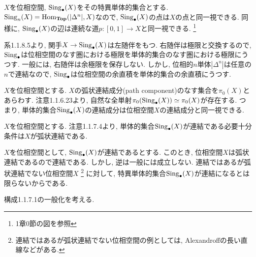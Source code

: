 \documentclass[uplatex, a4paper, 14Q, dvipdfmx]{jsreport}
\begin{document}
\begin{example}
  $X$を位相空間, $\mathrm{Sing}_\bullet(X)$をその特異単体的集合とする. 
  $\mathrm{Sing}_n(X)=\mathrm{Hom}_{\mathbf{Top}}(|\Delta^n|,X)$なので, $\mathrm{Sing}_\bullet(X)$の点は$X$の点と同一視できる. 
  同様に, $\mathrm{Sing}_\bullet(X)$の辺は連続な道$p: [0,1] \to X$と同一視できる. 
  \footnote{
    1章0節の図を参照
  }
\end{example}

\begin{remark}
  系1.1.8.5より, 関手$X \to \mathrm{Sing}_\bullet(X)$は左随伴をもつ. 
  右随伴は極限と交換するので, $\mathrm{Sing}_\bullet$は位相空間のなす圏における極限を単体的集合のなす圏における極限にうつす. 
  一般には, 右随伴は余極限を保存しない. 
  しかし, 位相的$n$単体$|\Delta^n|$は任意の$n$で連結なので, $\mathrm{Sing}_\bullet$は位相空間の余直積を単体的集合の余直積にうつす.
\end{remark}

\begin{remark}
  $X$を位相空間とする. 
  $X$の弧状連結成分(path component)のなす集合を$\pi_0(X)$とあらわす. 
  注意1.1.6.23より, 自然な全単射$\pi_0(\mathrm{Sing}_\bullet(X)) \simeq \pi_0(X)$が存在する.
  つまり, 単体的集合$\mathrm{Sing}_\bullet(X)$の連結成分は位相空間$X$の連結成分と同一視できる. 
\end{remark}

\begin{remark}
  $X$を位相空間とする. 
  注意1.1.7.4より, 単体的集合$\mathrm{Sing}_\bullet(X)$が連結である必要十分条件は$X$が弧状連結である. 
\end{remark}

\begin{remark}
  $X$を位相空間として, $\mathrm{Sing}_\bullet(X)$が連結であるとする. 
  このとき, 位相空間$X$は弧状連結であるので連結である. 
  しかし, 逆は一般には成立しない. 
  連結ではあるが弧状連結でない位相空間$X$
  \footnote{
    連結ではあるが弧状連結でない位相空間の例としては, Alexandroffの長い直線などがある. 
  }
  に対して, 特異単体的集合$\mathrm{Sing}_\bullet(X)$が連結になるとは限らないからである. 
\end{remark}

構成1.1.7.1の一般化を考える. 
\end{document}
